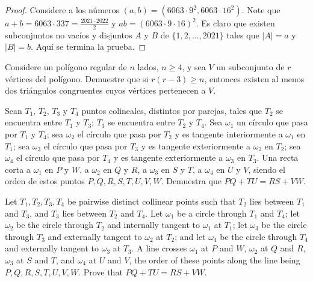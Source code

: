 \begin{proof}
  Considere a los números $(a,b)=(6063\cdot 9^2,6063\cdot 16^2)$. Note que
  $a+b=6063\cdot 337=\frac{2021\cdot 2022}{2}$ y $ab=(6063\cdot 9\cdot 16)^2$.
  Es claro que existen subconjuntos no vacíos y disjuntos $A$ y $B$ de
  $\{1,2,\dots,2021\}$ tales que $|A|=a$ y $|B|=b$. Aquí se termina la prueba.
\end{proof}

\begin{problem}[IberoAmerican 2021/6]
  Considere un polígono regular de $n$ lados, $n\ge 4$, y sea $V$ un subconjunto
  de $r$ vértices del polígono. Demuestre que si $r(r-3)\ge n$, entonces existen
  al menos dos triángulos congruentes cuyos vértices pertenecen a $V$.
\end{problem}

\begin{problem}[RMM 2021/1]
  Sean $T_1$, $T_2$, $T_3$ y $T_4$ puntos colineales, distintos por parejas,
  tales que $T_2$ se encuentra entre $T_1$ y $T_3$; $T_3$ se encuentra entre
  $T_2$ y $T_4$. Sea $\omega_1$ un círculo que pasa por $T_1$ y $T_4$; sea
  $\omega_2$ el círculo que pasa por $T_2$ y es tangente interiormente a
  $\omega_1$ en $T_1$; sea $\omega_3$ el círculo que pasa por $T_3$ y es
  tangente exteriormente a $\omega_2$ en $T_2$; sea $\omega_4$ el círculo que
  pasa por $T_4$ y es tangente exteriormente a $\omega_3$ en $T_3$. Una recta
  corta a $\omega_1$ en $P$ y $W$, a $\omega_2$ en $Q$ y $R$, a $\omega_3$ en
  $S$ y $T$, a $\omega_4$ en $U$ y $V$, siendo el orden de estos puntos
  $P,Q,R,S,T,U,V,W$. Demuestra que $PQ+TU=RS+VW$.
  \begin{hint}
    Let $T_1,T_2,T_3,T_4$ be pairwise distinct collinear points such that $T_2$
    lies between $T_1$ and $T_3$, and $T_3$ lies between $T_2$ and $T_4$. Let
    $\omega_1$ be a circle through $T_1$ and $T_4$; let $\omega_2$ be the circle
    through $T_2$ and internally tangent to $\omega_1$ at $T_1$; let $\omega_3$
    be the circle through $T_3$ and externally tangent to $\omega_2$ at $T_2$;
    and let $\omega_4$ be the circle through $T_4$ and externally tangent to
    $\omega_3$ at $T_3$. A line crosses $\omega_1$ at $P$ and $W$, $\omega_2$ at
    $Q$ and $R$, $\omega_3$ at $S$ and $T$, and $\omega_4$ at $U$ and $V$, the
    order of these points along the line being $P,Q,R,S,T,U,V,W$. Prove that
    $PQ+TU=RS+VW$.
  \end{hint}
\end{problem}

